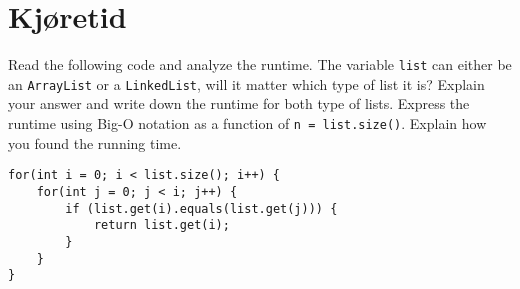 \documentclass{article}
\begin{document}
    \section{Kjøretid}

    Read the following code and analyze the runtime. The variable \texttt{list} can either be an \texttt{ArrayList} or a \texttt{LinkedList}, will it matter which type of list it is? Explain your answer and write down the runtime for both type of lists. Express the runtime using Big-O notation as a function of \texttt{n = list.size()}. Explain how you found the running time.

    \begin{lstlisting}
for(int i = 0; i < list.size(); i++) {
    for(int j = 0; j < i; j++) {
        if (list.get(i).equals(list.get(j))) {
            return list.get(i);
        }
    }
}
    \end{lstlisting}
\end{document}
